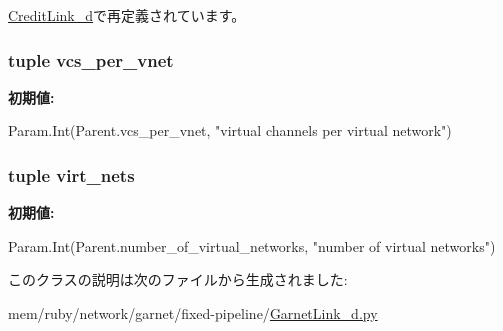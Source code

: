 \hyperlink{classGarnetLink__d_1_1CreditLink__d_acce15679d830831b0bbe8ebc2a60b2ca}{CreditLink\_\-d}で再定義されています。\hypertarget{classGarnetLink__d_1_1NetworkLink__d_a2bb2221cda9b94b6a0c2944d8a12f31e}{
\subsubsection[{vcs\_\-per\_\-vnet}]{\setlength{\rightskip}{0pt plus 5cm}tuple {\bf vcs\_\-per\_\-vnet}}}
\label{classGarnetLink__d_1_1NetworkLink__d_a2bb2221cda9b94b6a0c2944d8a12f31e}
{\bfseries 初期値:}
\begin{DoxyCode}
Param.Int(Parent.vcs_per_vnet,
                              "virtual channels per virtual network")
\end{DoxyCode}
\hypertarget{classGarnetLink__d_1_1NetworkLink__d_a84c7a415611bc1b55aa5e7fd9e9601e8}{
\subsubsection[{virt\_\-nets}]{\setlength{\rightskip}{0pt plus 5cm}tuple {\bf virt\_\-nets}}}
\label{classGarnetLink__d_1_1NetworkLink__d_a84c7a415611bc1b55aa5e7fd9e9601e8}
{\bfseries 初期値:}
\begin{DoxyCode}
Param.Int(Parent.number_of_virtual_networks,
                          "number of virtual networks")
\end{DoxyCode}


このクラスの説明は次のファイルから生成されました:\begin{DoxyCompactItemize}
\item 
mem/ruby/network/garnet/fixed-\/pipeline/\hyperlink{GarnetLink__d_8py}{GarnetLink\_\-d.py}\end{DoxyCompactItemize}
